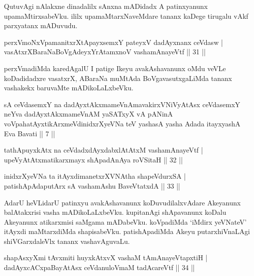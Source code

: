 \begin{artha}
QutuvAgi nAlakxne dinadalilx sAnxna mADidadx A patinxyanunx upamaMtirxsabeVku. ililx upamaMtarxNaveMdare tananx kaDege tirugalu vAkf parxyatanx mADuvudu.
\end{artha}

\begin{shl}
perxVmoNxVpamanitxrXtA\s payxsemxY pateyxV dadAyxnanx ceVdasw | \\
vasAtxrXBaraNaBoVgAdeyxYrAtamxnoV vashamAnayeVtf \hfill|| 31 ||  
\end{shl}

\begin{artha}
perxVmadiMda karedAgalU I patige Ikeyu avakAshavanunx oMdu veVLe 
koDadidadxre vasatxrX, ABaraNa muMtAda BoVgavasutxgaLiMda tananx 
vashakekx baruvaMte mADikoLaLxbeVku.
\end{artha}

\begin{shl}
sA ceVdasemxY na dadAyxtAkxmameVnAmavakirxVNiVyAtAsx ceVdasemxY neYva dadAyxtAkxmameVnAM yaSATxyX vA pANinA voVpahatAyxtikArxmeVdinidxrXyeVNa teV yashasA yasha Adada itayxyashA Eva Bavati || 7 ||
\end{shl}

\begin{shl}
tathA\s puyxkAtx na ceVdadxdAyxdabxlAtAtxM vashamAnayeVtf | \\
upeVyAtAtxmatikarxmayx shApadAnAya roVSitaH \hfill|| 32 || 
\end{shl}

\begin{shl}
inidxrXyeVNa ta itAyxdimanetxrXVNAtha shapeVdurxSA | \\
patishApAdaputArx sA vashamAshu BaveVtatxdA \hfill|| 33 || 
\end{shl}

\begin{artha}
AdarU heVLidarU patinxyu avakAshavanunx koDuvudilalxvAdare Akeyanunx 
balAtakxrisi vasha mADikoLaLxbeVku. kupitanAgi shApavanunx koDalu 
Akeyanunx atikarxmisi saMgama mADabeVku. koVpadiMda `iMdirx yeVNateV' itAyxdi 
maMtarxdiMda shapisabeVku. patishApadiMda Akeyu putarxhiVnaLAgi 
shiVGarxdaleVlx tananx vashavAguvaLu.
\end{artha}

\begin{shl}
shapAsxyXmi tAvxmiti huyxkAtxvX vashaM tAmAnayeVtapxtiH | \\
dadAyxcACxpaBayAtAsx ceVdanuloVmaM tadA\s \s careVtf \hfill|| 34 || 
\end{shl}

